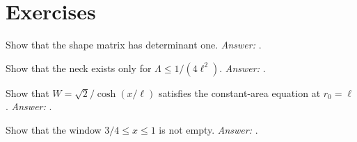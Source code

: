 \section*{Exercises}
\begin{exercise}Show that the shape matrix has determinant one. \emph{Answer:} .\end{exercise}
\begin{exercise}Show that the neck exists only for $\Lambda\le1/(4\ell^2)$. \emph{Answer:} .\end{exercise}
\begin{exercise}Show that $W=\sqrt2/\cosh(x/\ell)$ satisfies the constant-area equation at $r_0=\ell$. \emph{Answer:} .\end{exercise}
\begin{exercise}Show that the window $3/4\le x\le1$ is not empty. \emph{Answer:} .\end{exercise}
